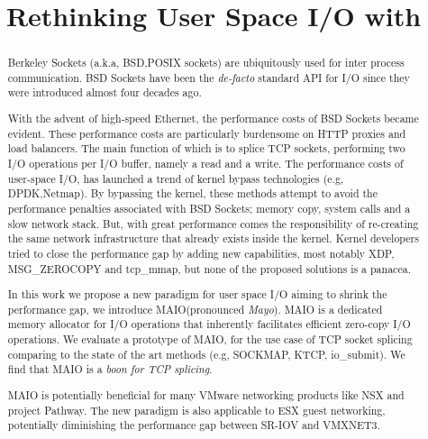 \documentclass[newfonts=false,format=sigconf,9pt,letterpaper]{acmart}
\title{Rethinking User Space I/O with \oursys}
\newcommand{\oursys}{MAIO\xspace}
\newcommand{\sockets}{BSD Sockets\xspace}
\begin{document}
\begin{abstract}
    Berkeley Sockets (a.k.a, BSD,POSIX sockets) are ubiquitously used for inter process communication. \sockets have been the \emph{de-facto} standard API for I/O since they were introduced almost four decades ago. 
    
    With the advent of high-speed Ethernet, the performance costs of \sockets became evident. These performance costs are particularly burdensome on HTTP proxies and load balancers. The main function of which is to splice TCP sockets, performing two I/O operations per I/O buffer, namely a read and a write. The performance costs of user-space I/O, has launched a trend of kernel bypass technologies (e.g, DPDK,Netmap). By bypassing the kernel, these methods attempt to avoid the performance penalties associated with \sockets; memory copy, system calls and a slow network stack. But, with great performance comes the responsibility of re-creating the same network infrastructure that already exists inside the kernel. Kernel developers tried to close the performance gap by adding new capabilities, most notably XDP, MSG\_ZEROCOPY and tcp\_mmap, but none of the proposed solutions is a panacea.
    
    In this work we propose a new paradigm for user space I/O aiming to shrink the performance gap, we introduce \oursys (pronounced \emph{Mayo}). \oursys is a dedicated memory allocator for I/O operations that inherently facilitates efficient zero-copy I/O operations. We evaluate a prototype of \oursys, for the use case of TCP socket splicing comparing to  the state of the art methods (e.g, SOCKMAP, KTCP, io\_submit). We find that \oursys is a \emph{boon for TCP splicing}. 
    
    \oursys is potentially beneficial for many VMware networking products like NSX and project Pathway. The new paradigm is also applicable to ESX guest networking, potentially diminishing the performance gap between SR-IOV and VMXNET3. 
    
    
\end{abstract}
\end{document}
